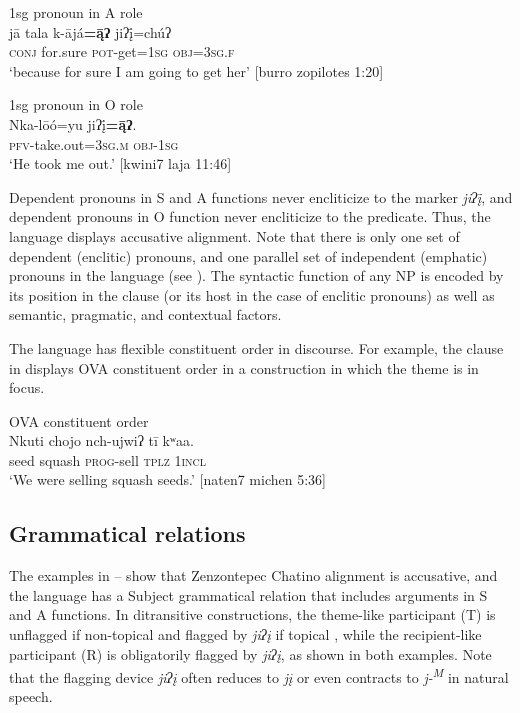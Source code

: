 \documentclass[output=paper]{../langscibook}
\begin{document}
\ea\label{ex:campbell:7}
{1sg pronoun in A role}\\
\gll jā  tala  k-ājá\textbf{=\={ą}ʔ}  jiʔį̄=chúʔ\\
     \textsc{conj}  for.sure  \textsc{pot}{}-get=\textsc{1sg}  \textsc{obj}=\textsc{3sg.f}\\
\glt ‘because for sure I am going to get her’ [burro zopilotes 1:20]
\z

\ea\label{ex:campbell:8}
{1sg pronoun in O role}\\
\gll Nka-lōó=yu  jiʔį̄\textbf{=\={ą}ʔ}.\\
     \textsc{pfv}{}-take.out=\textsc{3sg.m}  \textsc{obj}{}-\textsc{1sg}\\
\glt ‘He took me out.’ [kwini7 laja 11:46]
\z


Dependent pronouns in S and A functions never encliticize to the marker \textit{jiʔį̄}, and dependent pronouns in O function never encliticize to the predicate. Thus, the language displays accusative alignment. Note that there is only one set of dependent (enclitic) pronouns, and one parallel set of independent (emphatic) pronouns in the language (see ). The syntactic function of any NP is encoded by its position in the clause (or its host in the case of enclitic pronouns) as well as semantic, pragmatic, and contextual factors.



The language has flexible constituent order in discourse. For example, the clause in  displays OVA constituent order in a construction in which the theme is in focus.


\ea\label{ex:campbell:9}
{OVA constituent order}\\
\gll Nkuti  chojo  nch-ujwiʔ  tī  kʷaa.\\
     seed  squash  \textsc{prog}{}-sell  \textsc{tplz}  \textsc{1incl}\\
\glt ‘We were selling squash seeds.’ [naten7 michen 5:36]
\z

\subsection{Grammatical relations}
\label{sec:campbell:3.2}
The examples in -- show that Zenzontepec Chatino alignment is accusative, and the language has a Subject grammatical relation that includes arguments in S and A functions. In ditransitive constructions, the theme-like participant (T) is unflagged if non-topical  and flagged by \textit{jiʔį} if topical , while the recipient-like participant (R) is obligatorily flagged by \textit{jiʔį}, as shown in both examples. Note that the flagging device \textit{jiʔį} often reduces to \textit{jį} or even contracts to \textit{j-\textsuperscript{M}} in natural speech.
\end{document}
